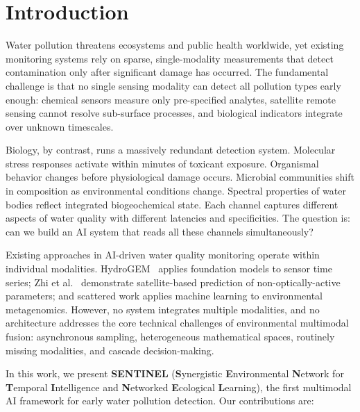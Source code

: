 \section{Introduction}
\label{sec:introduction}

Water pollution threatens ecosystems and public health worldwide, yet existing
monitoring systems rely on sparse, single-modality measurements that detect
contamination only after significant damage has occurred. The fundamental challenge
is that no single sensing modality can detect all pollution types early enough:
chemical sensors measure only pre-specified analytes, satellite remote sensing
cannot resolve sub-surface processes, and biological indicators integrate over
unknown timescales.

Biology, by contrast, runs a massively redundant detection system. Molecular
stress responses activate within minutes of toxicant exposure. Organismal
behavior changes before physiological damage occurs. Microbial communities shift
in composition as environmental conditions change. Spectral properties of water
bodies reflect integrated biogeochemical state. Each channel captures different
aspects of water quality with different latencies and specificities. The question
is: can we build an AI system that reads all these channels simultaneously?

Existing approaches in AI-driven water quality monitoring operate within
individual modalities. HydroGEM~\citep{Loreaux2025} applies foundation models to
sensor time series; Zhi et al.~\citep{Zhi2024} demonstrate satellite-based
prediction of non-optically-active parameters; and scattered work applies
machine learning to environmental metagenomics. However, no system integrates
multiple modalities, and no architecture addresses the core technical
challenges of environmental multimodal fusion: asynchronous sampling,
heterogeneous mathematical spaces, routinely missing modalities, and cascade
decision-making.

In this work, we present \textbf{SENTINEL} (\textbf{S}ynergistic
\textbf{E}nvironmental \textbf{N}etwork for \textbf{T}emporal
\textbf{I}ntelligence and \textbf{N}etworked \textbf{E}cological
\textbf{L}earning), the first multimodal AI framework for early water
pollution detection. Our contributions are:

